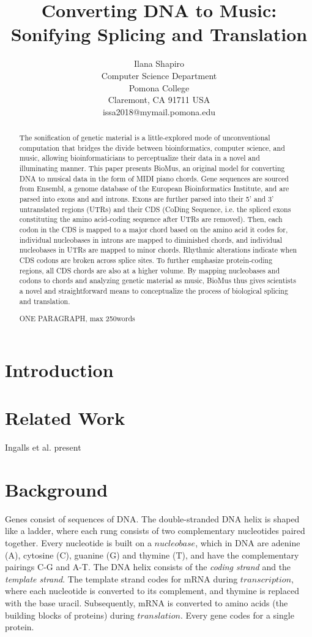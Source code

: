 \documentclass[letterpaper]{article}
\title{Converting DNA to Music: Sonifying Splicing and Translation}
\author{Ilana Shapiro\\
Computer Science Department\\
Pomona College\\
Claremont, CA 91711 USA\\
issa2018@mymail.pomona.edu\\
}
\begin{document}
 
\maketitle
\begin{abstract}
The sonification of genetic material is a little-explored mode of unconventional computation that bridges the divide between bioinformatics, computer science, and music, allowing bioinformaticians to perceptualize their data in a novel and illuminating manner. This paper presents BioMus, an original model for converting DNA to musical data in the form of MIDI piano chords. Gene sequences are sourced from Ensembl, a genome database of the European Bioinformatics Institute, and are parsed into exons and and introns. Exons are further parsed into their 5' and 3' untranslated regions (UTRs) and their CDS (CoDing Sequence, i.e. the spliced exons constituting the amino acid-coding sequence after UTRs are removed). Then, each codon in the CDS is mapped to a major chord based on the amino acid it codes for, individual nucleobases in introns are mapped to diminished chords, and individual nucleobases in UTRs are mapped to minor chords. Rhythmic alterations indicate when CDS codons are broken across splice sites. To further emphasize protein-coding regions, all CDS chords are also at a higher volume. By mapping nucleobases and codons to chords and analyzing genetic material as music, BioMus thus gives scientists a novel and straightforward means to conceptualize the process of biological splicing and translation.

ONE PARAGRAPH, max 250words
\end{abstract}

\section{Introduction}

\section{Related Work}

Ingalls et al. present 

\section{Background}
Genes consist of sequences of DNA. The double-stranded DNA helix is shaped like a ladder, where each rung consists of two complementary nucleotides paired together. Every nucleotide is built on a $nucleobase$, which in DNA are adenine (A), cytosine (C), guanine (G) and thymine (T), and have the complementary pairings C-G and A-T. The DNA helix consists of the \textit{coding strand} and the \textit{template strand}. The template strand codes for mRNA during $transcription$, where each nucleotide is converted to its complement, and thymine is replaced with the base uracil.%
Subsequently, mRNA is converted to amino acids (the building blocks of proteins) during $translation$. Every gene codes for a single protein.
\end{document}
